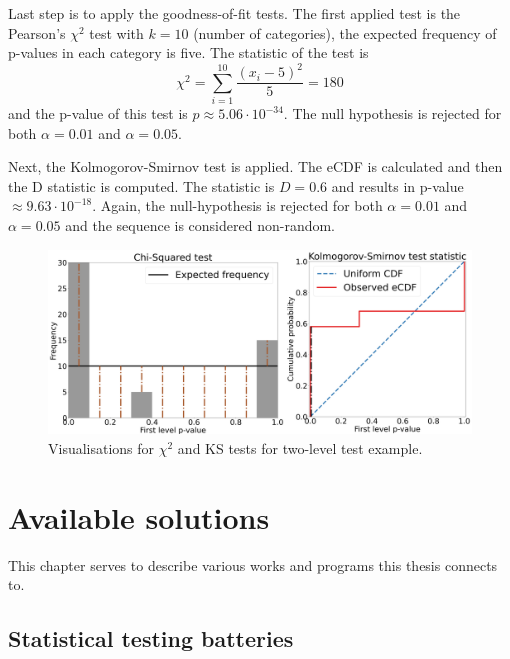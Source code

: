 \documentclass[
  digital,     %
  oneside,     %
  nosansbold,  %
  nocolorbold, %
  nolof,         %
  nolot,         %
]{fithesis4}
\begin{document}
Last step is to apply the goodness-of-fit tests. The first applied test is the Pearson's $\chi^2$ test with $k=10$ (number of categories), the expected frequency of p-values in each category is five. The statistic of the test is
\[\chi^2 = \sum_{i=1}^{10} \dfrac{(x_i - 5)^2}{5} = 180 \]
and the p-value of this test is $p\approx5.06\cdot10^{-34}$. The null hypothesis is rejected for both $\alpha = 0.01$ and $\alpha = 0.05$. 

Next, the Kolmogorov-Smirnov test is applied. The eCDF is calculated and then the D statistic is computed. The statistic is $D = 0.6$ and results in p-value $\approx 9.63\cdot10^{-18}$. Again, the null-hypothesis is rejected for both $\alpha = 0.01$ and $\alpha = 0.05$ and the sequence is considered non-random.

\begin{figure}
  \begin{center}
    \includegraphics[width=12.5cm]{figures/two_example.png}
  \end{center}
  \caption{Visualisations for $\chi^2$ and KS tests for two-level test example.}
  \label{fig:two_example}
\end{figure}



\chapter{Available solutions}


This chapter serves to describe various works and programs this thesis connects to.


\section{Statistical testing batteries}
\end{document}
